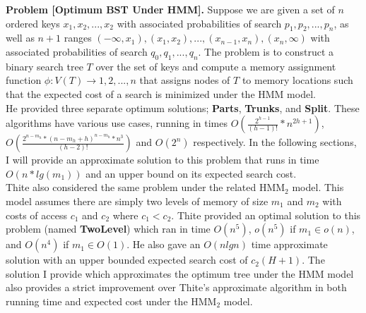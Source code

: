 \documentclass[letterpaper,12pt,titlepage,oneside,final]{book}
\theoremstyle{plain}
\begin{document}
\textbf{Problem [Optimum BST Under HMM].} Suppose we are given a set of $n$ ordered keys $x_1, x_2, ..., x_2$ with associated probabilities of search $p_1, p_2, ..., p_n$, as well as $n+1$ ranges $(- \infty, x_1), (x_1, x_2), ..., (x_{n-1}, x_n), (x_n, \infty)$ with associated probabilities of search $q_0, q_1, ..., q_n$. The problem is to construct a binary search tree $T$ over the set of keys and compute a memory assignment function $\phi : V (T) \rightarrow {1, 2, ..., n}$ that assigns nodes of $T$ to memory locations such that the expected cost of a search is minimized under the HMM model.\\


He provided three separate optimum solutions; \textbf{Parts}, \textbf{Trunks}, and \textbf{Split}. These algorithms have various use cases, running in times $O(\frac{2^{h-1}}{(h-1)!}* n^{2h+1})$, $O(\frac{2^{n-m_h}*(n-m_h+h)^{n-m_h}*n^3}{(h-2)!})$ and $O(2^n)$ respectively. In the following sections, I will provide an approximate solution to this problem that runs in time $O(n*lg(m_1))$ and an upper bound on its expected search cost.  \\

Thite also considered the same problem under the related HMM$_2$ model. This model assumes there are simply two levels of memory of size $m_1$ and $m_2$ with costs of access $c_1$ and $c_2$ where $c_1 < c_2$. Thite provided an optimal solution to this problem (named \textbf{TwoLevel}) which ran in time $O(n^5)$, $o(n^5)$ if $m_1 \in o(n)$, and $O(n^4)$ if $m_1 \in O(1)$. He also gave an $O(nlg n)$ time approximate solution with an upper bounded expected search cost of $c_2(H+1)$. The solution I provide which approximates the optimum tree under the HMM model also provides a strict improvement over Thite's approximate algorithm in both running time and expected cost under the HMM$_2$ model.
\end{document}
